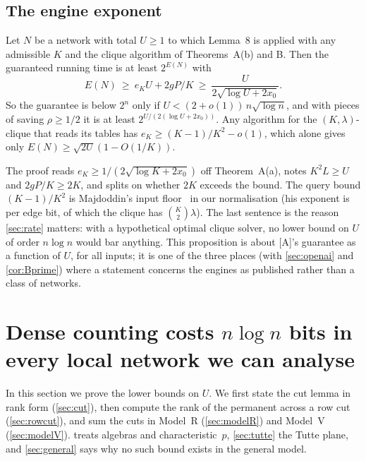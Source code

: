 \documentclass[10pt]{amsart}
\theoremstyle{plain}
\theoremstyle{definition}
\theoremstyle{remark}
\numberwithin{equation}{section}
\newcommand{\A}{\textup{[A]}}
\begin{document}
\subsection{The engine exponent}
\begin{proposition}\label{prop:exponent}
Let $N$ be a network with total $U\ge1$ to which Lemma~8 is applied with any admissible $K$ and the
clique algorithm of Theorems~A(b) and B. Then the guaranteed running time is at least $2^{E(N)}$ with
\[
  E(N)\ \ge\ e_KU+2gP/K\ \ge\ \frac{U}{2\sqrt{\log U+2x_0}}.
\]
So the guarantee is below $2^n$ only if $U<(2+o(1))\,n\sqrt{\log n}$, and with pieces of saving
$\rho\ge1/2$ it is at least $2^{U/(2(\log U+2x_0))}$. Any algorithm for the $(K,\lambda)$-clique that
reads its tables has $e_K\ge(K-1)/K^2-o(1)$, which alone gives only $E(N)\ge\sqrt{2U}(1-O(1/K))$.
\end{proposition}

\noindent The proof reads $e_K\ge1/(2\sqrt{\log K+2x_0})$ off Theorem~A(a), notes $K^2L\ge U$ and
$2gP/K\ge2K$, and splits on whether $2K$ exceeds the bound. The query bound $(K-1)/K^2$ is Majdoddin's
input floor~\cite[Proposition~2.4(a)]{Maj26} in our normalisation (his exponent is per edge bit, of
which the clique has $\binom K2\lambda$). The last sentence is the reason
\cref{sec:rate} matters: with a hypothetical optimal clique solver, no lower bound on $U$ of order
$n\log n$ would bar anything. This proposition is about \A's guarantee as a function of $U$, for all
inputs; it is one of the three places (with \cref{sec:openai} and \cref{cor:Bprime}) where a
statement concerns the engines as published rather than a class of networks.

\section{Dense counting costs \texorpdfstring{$n\log n$}{n log n} bits in every local network we can analyse}\label{sec:wall}

In this section we prove the lower bounds on $U$. We first state the cut lemma in rank form
(\cref{sec:cut}), then compute the rank of the permanent across a row cut (\cref{sec:rowcut}), and
sum the cuts in Model~R (\cref{sec:modelR}) and Model~V (\cref{sec:modelV}). 
treats algebras and characteristic~$p$, \cref{sec:tutte} the Tutte plane, and \cref{sec:general} says
why no such bound exists in the general model.
\end{document}
